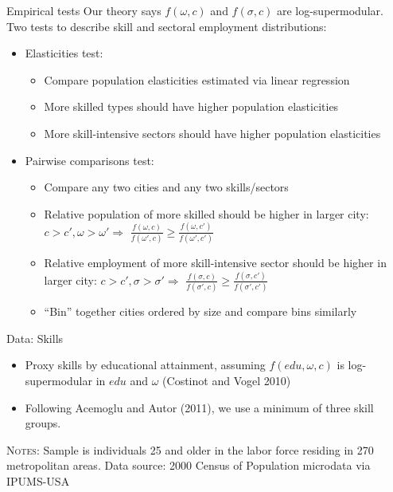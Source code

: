 \documentclass[10pt,notes=hide]{beamer}
\begin{document}
\begin{frame}{Empirical tests}
Our theory says $f(\omega,c)$ and $f(\sigma,c)$ are log-supermodular. 
Two tests to describe skill and sectoral employment distributions:
\begin{itemize}
\item Elasticities test: 
\begin{itemize}
\item Compare population elasticities estimated via linear regression
\item More skilled types should have higher population elasticities
\item More skill-intensive sectors should have higher population elasticities
\end{itemize}
\item Pairwise comparisons test:
\begin{itemize}
\item Compare any two cities and any two skills/sectors
\item Relative population of more skilled should be higher in larger city:
$c>c',\omega>\omega'\Rightarrow$ $\frac{f(\omega,c)}{f(\omega',c)}\geq\frac{f(\omega,c')}{f(\omega',c')}$
\item Relative employment of more skill-intensive sector should be higher
in larger city: $c>c',\sigma>\sigma'\Rightarrow$ $\frac{f(\sigma,c)}{f(\sigma',c)}\geq\frac{f(\sigma,c')}{f(\sigma',c')}$
\item ``Bin'' together cities ordered by size and compare bins similarly
\end{itemize}
\end{itemize}
\end{frame}
\begin{frame}{Data: Skills}
\begin{itemize}
\item Proxy skills by educational attainment, assuming $f(edu,\omega,c)$
is log-supermodular in $edu$ and $\omega$ (Costinot and Vogel 2010)
\item Following Acemoglu and Autor (2011), we use a minimum of three skill
groups.
\end{itemize}
\resizebox{\textwidth}{!}{}
\begin{minipage}{.9\textwidth}\begin{center}
\scriptsize{\flushleft \textsc{Notes}: Sample is individuals 25 and older in the labor force residing in 270 metropolitan areas. Data source: 2000 Census of Population microdata via IPUMS-USA\par}
\end{center}\end{minipage}
\end{frame}
\end{document}

